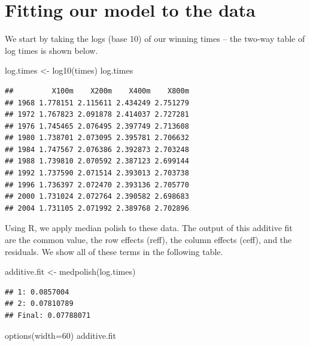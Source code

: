 \documentclass[
]{book}
\newenvironment{Shaded}{\begin{snugshade}}{\end{snugshade}}
\newcommand{\AttributeTok}[1]{\textcolor[rgb]{0.77,0.63,0.00}{#1}}
\newcommand{\DecValTok}[1]{\textcolor[rgb]{0.00,0.00,0.81}{#1}}
\newcommand{\FunctionTok}[1]{\textcolor[rgb]{0.00,0.00,0.00}{#1}}
\newcommand{\NormalTok}[1]{#1}
\newcommand{\OtherTok}[1]{\textcolor[rgb]{0.56,0.35,0.01}{#1}}
\begin{document}
\hypertarget{fitting-our-model-to-the-data}{%
\section{Fitting our model to the data}\label{fitting-our-model-to-the-data}}

We start by taking the logs (base 10) of our winning times -- the two-way table of log times is shown below.

\begin{Shaded}
\begin{Highlighting}[]
\NormalTok{log.times }\OtherTok{\textless{}{-}} \FunctionTok{log10}\NormalTok{(times)}
\NormalTok{log.times}
\end{Highlighting}
\end{Shaded}

\begin{verbatim}
##         X100m    X200m    X400m    X800m
## 1968 1.778151 2.115611 2.434249 2.751279
## 1972 1.767823 2.091878 2.414037 2.727281
## 1976 1.745465 2.076495 2.397749 2.713608
## 1980 1.738701 2.073095 2.395781 2.706632
## 1984 1.747567 2.076386 2.392873 2.703248
## 1988 1.739810 2.070592 2.387123 2.699144
## 1992 1.737590 2.071514 2.393013 2.703738
## 1996 1.736397 2.072470 2.393136 2.705770
## 2000 1.731024 2.072764 2.390582 2.698683
## 2004 1.731105 2.071992 2.389768 2.702896
\end{verbatim}

Using R, we apply median polish to these data. The output of this additive fit are the common value, the row effects (reff), the column effects (ceff), and the residuals. We show all of these terms in the following table.

\begin{Shaded}
\begin{Highlighting}[]
\NormalTok{additive.fit }\OtherTok{\textless{}{-}} \FunctionTok{medpolish}\NormalTok{(log.times)}
\end{Highlighting}
\end{Shaded}

\begin{verbatim}
## 1: 0.0857004
## 2: 0.07810789
## Final: 0.07788071
\end{verbatim}

\begin{Shaded}
\begin{Highlighting}[]
\FunctionTok{options}\NormalTok{(}\AttributeTok{width=}\DecValTok{60}\NormalTok{)}
\NormalTok{additive.fit}
\end{Highlighting}
\end{Shaded}
\end{document}
